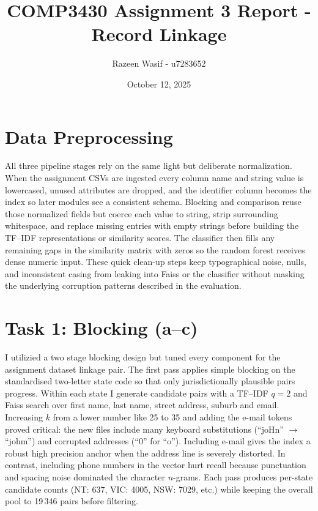 \documentclass[11pt]{article}
\title{COMP3430 Assignment 3 Report - Record Linkage}
\author{Razeen Wasif - u7283652}
\date{October 12, 2025}
\begin{document}
\maketitle

\section*{Data Preprocessing}
All three pipeline stages rely on the same light but deliberate normalization. When the assignment CSVs are ingested every column name and string value is lowercased, unused attributes are dropped, and the identifier column becomes the index so later modules see a consistent schema. Blocking and comparison reuse those normalized fields but coerce each value to string, strip surrounding whitespace, and replace missing entries with empty strings before building the TF--IDF representations or similarity scores. The classifier then fills any remaining gaps in the similarity matrix with zeros so the random forest receives dense numeric input. These quick clean-up steps keep typographical noise, nulls, and inconsistent casing from leaking into Faiss or the classifier without masking the underlying corruption patterns described in the evaluation.

\section*{Task 1: Blocking (a--c)}
I utilizied a two stage blocking design but tuned every component for the assignment dataset linkage pair. The first pass applies simple blocking on the standardised two-letter state code so that only jurisdictionally plausible pairs progress. Within each state I generate candidate pairs with a TF--IDF $q{=}2$ and Faiss search over first name, last name, street address, suburb and email. Increasing $k$ from a lower number like 25 to 35 and adding the e-mail tokens proved critical: the new files include many keyboard substitutions (``joHn'' $\rightarrow$ ``johm'') and corrupted addresses (``0'' for ``o''). Including e-mail gives the index a robust high precision anchor when the address line is severely distorted. In contrast, including phone numbers in the vector hurt recall because punctuation and spacing noise dominated the character $n$-grams. Each pass produces per-state candidate counts (NT: 637, VIC: 4005, NSW: 7029, etc.) while keeping the overall pool to 19\,346 pairs before filtering.
\end{document}

